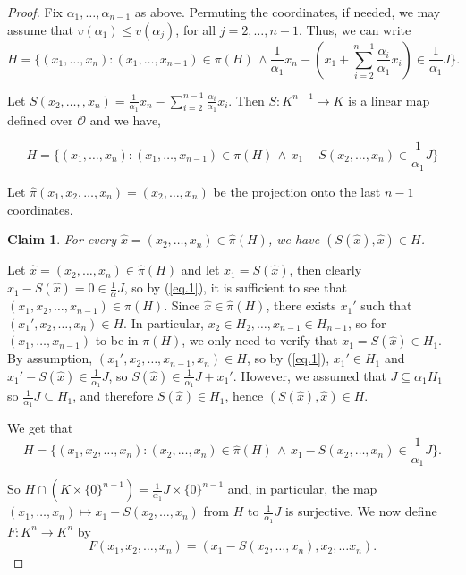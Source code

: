 \documentclass[11pt]{amsart}
\newtheorem{claim}{Claim}[theorem]
\theoremstyle{definition}
\newcommand{\CO}{{\mathcal O}}
\newcommand{\0}{\emptyset}
\def\sub{\subseteq}
\newenvironment{claimproof}[1][\proofname]
  {%
    \proof[#1]%
      \renewcommand*\qedsymbol{$\square$ (claim)}%
  }
  {%
    \endproof%
  }
\begin{document}
\begin{proof}
Fix $\alpha_1, \dots, \alpha_{n-1}$ as above. Permuting the coordinates, if needed, we may assume that $v(\alpha_1)\leq v(\alpha_j)$, for all $j=2,\ldots, n-1$. Thus, we can write 
\[H=\{(x_1,\ldots, x_n): (x_1,\ldots, x_{n-1})\in \pi(H)\,\wedge \frac{1}{\alpha_1}x_n-(x_1+\sum_{i=2}^{n-1} \frac{\alpha_i}{\alpha_1} x_i)\in \frac{1}{\alpha_1}J\}.\]

Let $S(x_2,\ldots, ,x_n)=\frac{1}{\alpha_1}x_n-\sum_{i=2}^{n-1} \frac{\alpha_i}{\alpha_1}x_i.$ Then $S:K^{n-1}\to K$ is a linear map defined over $\CO$ and we have,

\begin{equation}\label{eq.1}H=\{(x_1,\ldots, x_n): (x_1,\ldots, x_{n-1})\in \pi(H)\,\wedge \, x_1
-S(x_2,\ldots, x_n) \in \frac{1}{\alpha_1}J\}\end{equation}

Let $\hat \pi(x_1,x_2,\ldots, x_n)=(x_2,\ldots, x_n)$ be the projection onto the last $n-1$ coordinates. 
\begin{claim}\label{claim1}
    For every $\hat x=(x_2,\ldots, x_n)\in \hat \pi (H)$, we have $(S(\hat x),\hat x)\in H$.
\end{claim}
\begin{claimproof}
    Let $\hat x=(x_2,\dots,x_n)\in \hat \pi(H)$ and let $x_1=S(\hat x)$, then clearly $x_1-S(\hat x)=0\in \frac{1}{\alpha}J$, so by (\ref{eq.1}), it is sufficient to see that $(x_1,x_2,\ldots, x_{n-1})\in \pi(H)$. Since $\hat x\in \hat \pi(H)$,  there exists $x_1'$ such that $(x_1',x_2,\ldots, x_n)\in H$. In particular, $x_2\in H_2,\ldots, x_{n-1}\in H_{n-1}$, so for $(x_1,\ldots, x_{n-1})$ to be in $\pi(H)$, we only need to verify that $x_1=S(\hat x)\in H_1$. By assumption, $(x_1',x_2,\ldots, x_{n-1}, x_{n})\in H$, so by (\ref{eq.1}), $x_1'\in H_1$ and 
$x_1'-S(\hat x)\in \frac{1}{\alpha_1} J$, so $S(\hat x)\in \frac{1}{\alpha_1}J+x_1'$. However, we assumed that  $J\sub \alpha_1 H_1$ so $\frac{1}{\alpha_1}J\sub H_1$, and therefore $S(\hat x)\in H_1$, hence $(S(\hat x),\hat x)\in H$. 
\end{claimproof}

We get that 
\[H=\{(x_1,x_2,\ldots, x_n):(x_2,\ldots, x_n)\in \hat \pi(H) \,\wedge\, x_1-S(x_2,\ldots, x_n)\in \frac{1}{\alpha_1}J\}.\]


So $H\cap (K\times  \{0\}^{n-1})=\frac{1}{\alpha_1}J\times \{0\}^{n-1}$ and, in particular, the  map $(x_1,\dots, x_n)\mapsto x_1-S(x_2,\dots, x_n)$ from $H$ to $\frac{1}{\alpha_1}J$ is surjective. 
We now define $F:K^n\to K^n$ by \[F(x_1,x_2,\ldots, x_n)=(x_1-S(x_2,\ldots, x_n),x_2, \ldots x_n).\]


\end{proof}
\end{document}
